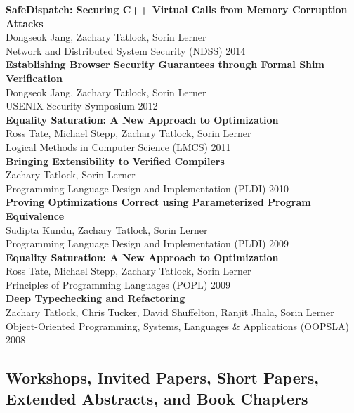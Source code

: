 \documentclass[10pt]{article}
\begin{document}
\textbf{%
SafeDispatch: Securing C++ Virtual Calls from Memory Corruption Attacks
} \\
Dongseok Jang, Zachary Tatlock, Sorin Lerner \\
Network and Distributed System Security (NDSS) 2014 \\

\textbf{%
Establishing Browser Security Guarantees through Formal Shim Verification
} \\
Dongseok Jang, Zachary Tatlock, Sorin Lerner \\
USENIX Security Symposium 2012 \\

\textbf{%
Equality Saturation: A New Approach to Optimization
} \\
Ross Tate, Michael Stepp, Zachary Tatlock, Sorin Lerner \\
Logical Methods in Computer Science (LMCS) 2011 \\

\textbf{%
Bringing Extensibility to Verified Compilers
} \\
Zachary Tatlock, Sorin Lerner \\
Programming Language Design and Implementation (PLDI) 2010 \\

\textbf{%
Proving Optimizations Correct using Parameterized Program Equivalence
} \\
Sudipta Kundu, Zachary Tatlock, Sorin Lerner \\
Programming Language Design and Implementation (PLDI) 2009 \\

\textbf{%
Equality Saturation: A New Approach to Optimization
} \\
Ross Tate, Michael Stepp, Zachary Tatlock, Sorin Lerner \\
Principles of Programming Languages (POPL) 2009 \\

\textbf{%
Deep Typechecking and Refactoring
} \\
Zachary Tatlock, Chris Tucker, David Shuffelton, Ranjit Jhala, Sorin Lerner \\
Object-Oriented Programming, Systems, Languages \& Applications (OOPSLA) 2008


\subsection*{Workshops, Invited Papers, Short Papers, Extended Abstracts, and Book Chapters}
\end{document}
